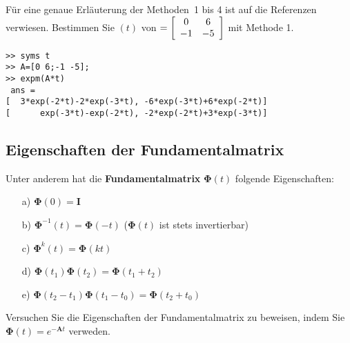 F\"ur eine genaue Erl\"auterung der Methoden~1 bis 4 ist auf die Referenzen \cite{HSU:95, UNB:89} verwiesen.
\aufg Bestimmen Sie \mat{\Phi}$(t)$ von $=\left [ 
\begin{array}{c c}
0 & 6 \\
-1 & -5\\
\end{array}
\right ] $ mit Methode 1. 
\begin{verbatim}
>> syms t
>> A=[0 6;-1 -5];
>> expm(A*t)
 ans =
[  3*exp(-2*t)-2*exp(-3*t), -6*exp(-3*t)+6*exp(-2*t)]
[      exp(-3*t)-exp(-2*t), -2*exp(-2*t)+3*exp(-3*t)]
\end{verbatim}

\subsection{Eigenschaften der Fundamentalmatrix}
Unter anderem hat die {\bf Fundamentalmatrix} $\boldsymbol{\Phi}(t)$ folgende Eigenschaften:\\
\begin{enumerate}
  \item[a)] $\boldsymbol{\Phi}(0)=\boldsymbol{I}$
  \item[b)] $\boldsymbol{\Phi}^{-1}(t)=\boldsymbol{\Phi}(-t)$   ($\boldsymbol{\Phi}(t)$ ist stets invertierbar)
  \item[c)] $\boldsymbol{\Phi}^k(t)=\boldsymbol{\Phi}(kt)$
  \item[d)]  $\boldsymbol{\Phi}(t_1)\boldsymbol{\Phi}(t_2)=\boldsymbol{\Phi}(t_1+t_2)$
  \item[e)]  $\boldsymbol{\Phi}(t_2-t_1)\boldsymbol{\Phi}(t_1-t_0)=\boldsymbol{\Phi}(t_2+t_0)$
\end{enumerate}
\aufg Versuchen Sie die Eigenschaften der Fundamentalmatrix zu beweisen, indem Sie  $\boldsymbol{\Phi}(t)=e^{-\boldsymbol{A}t}$ verweden.

